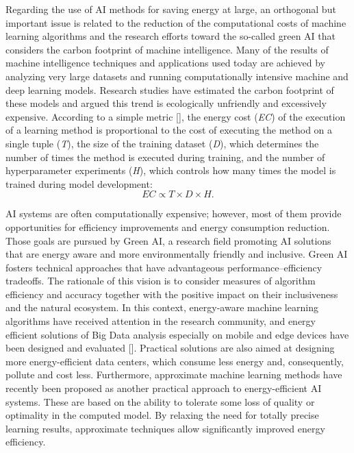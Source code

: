Regarding the use of AI methods for saving energy at large, an orthogonal but important issue is related to the reduction of the computational costs of machine learning algorithms and the research efforts toward the so-called green AI that considers the carbon footprint of machine intelligence. Many of the results of machine intelligence techniques and applications used today are achieved by analyzing very large datasets and running computationally intensive machine and deep learning models. Research studies have estimated the carbon footprint of these models and argued this trend is ecologically unfriendly and excessively expensive. According to a simple metric [\citealt{chap:6:Schwartzetal:2020}], the energy cost (\textit{EC}) of the execution of a learning method is proportional to the cost of executing the method on a single tuple (\textit{T}), the size of the training dataset (\textit{D}), which determines the number of times the method is executed during training, and the number of hyperparameter experiments (\textit{H}), which controls how many times the model is trained during model development:\vspace*{2pt}
\begin{equation*}
\textit{EC} \propto T \times D \times H.
\end{equation*}
\removelastskip{\vfill\pagebreak}

\noindent AI systems are often computationally expensive; however, most of them provide opportunities for efficiency improvements and energy consumption reduction. Those goals are pursued by Green AI, a research field promoting AI solutions that are energy aware and more environmentally friendly and inclusive. Green AI fosters technical approaches that have advantageous performance--efficiency tradeoffs. The rationale of this vision is to consider measures of algorithm efficiency and accuracy together with the positive impact on their inclusiveness and the natural ecosystem. In this context, energy-aware machine learning algorithms have received attention in the research community, and energy efficient solutions of Big Data analysis especially on mobile and edge devices have been designed and evaluated [\citealt{chap:6:ComitoandTalia:2017}]. Practical solutions are also aimed at designing more energy-efficient data centers, which consume less energy and, consequently, pollute and cost less. Furthermore, approximate machine learning methods have recently been proposed as another practical approach to energy-efficient AI systems. These are based on the ability to tolerate some loss of quality or optimality in the computed model. By relaxing the need for totally precise learning results, approximate techniques allow significantly improved energy efficiency.

